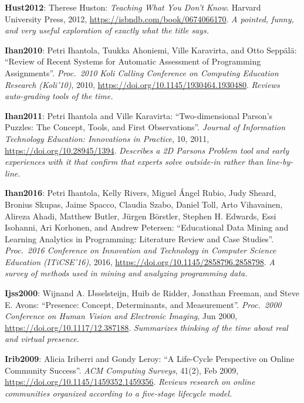 \textbf{\hypertarget{b:Hust2012}{Hust2012}\label{b:Hust2012}}: Therese Huston: \emph{Teaching What You Don't Know}. Harvard University Press, 2012, \url{https://isbndb.com/book/0674066170}. \emph{A pointed, funny, and very useful exploration of exactly what the title says.}

\textbf{\hypertarget{b:Ihan2010}{Ihan2010}\label{b:Ihan2010}}: Petri Ihantola, Tuukka Ahoniemi, Ville Karavirta, and Otto Seppälä: ``Review of Recent Systems for Automatic Assessment of Programming Assignments''. \emph{Proc.\ 2010 Koli Calling Conference on Computing Education Research (Koli'10)}, 2010, \url{https://doi.org/10.1145/1930464.1930480}. \emph{Reviews auto-grading tools of the time.}

\textbf{\hypertarget{b:Ihan2011}{Ihan2011}\label{b:Ihan2011}}: Petri Ihantola and Ville Karavirta: ``Two-dimensional Parson's Puzzles: The Concept, Tools, and First Observations''. \emph{Journal of Information Technology Education: Innovations in Practice}, 10, 2011, \url{https://doi.org/10.28945/1394}. \emph{Describes a 2D Parsons Problem tool and early experiences with it that confirm that experts solve outside-in rather than line-by-line.}

\textbf{\hypertarget{b:Ihan2016}{Ihan2016}\label{b:Ihan2016}}: Petri Ihantola, Kelly Rivers, Miguel Ángel Rubio, Judy Sheard, Bronius Skupas, Jaime Spacco, Claudia Szabo, Daniel Toll, Arto Vihavainen, Alireza Ahadi, Matthew Butler, Jürgen Börstler, Stephen H. Edwards, Essi Isohanni, Ari Korhonen, and Andrew Petersen: ``Educational Data Mining and Learning Analytics in Programming: Literature Review and Case Studies''. \emph{Proc.\ 2016 Conference on Innovation and Technology in Computer Science Education (ITiCSE'16)}, 2016, \url{https://doi.org/10.1145/2858796.2858798}. \emph{A survey of methods used in mining and analyzing programming data.}

\textbf{\hypertarget{b:Ijss2000}{Ijss2000}\label{b:Ijss2000}}: Wijnand A. IJsselsteijn, Huib de Ridder, Jonathan Freeman, and Steve E. Avons: ``Presence: Concept, Determinants, and Measurement''. \emph{Proc.\ 2000 Conference on Human Vision and Electronic Imaging}, Jun 2000, \url{https://doi.org/10.1117/12.387188}. \emph{Summarizes thinking of the time about real and virtual presence.}

\textbf{\hypertarget{b:Irib2009}{Irib2009}\label{b:Irib2009}}: Alicia Iriberri and Gondy Leroy: ``A Life-Cycle Perspective on Online Community Success''. \emph{ACM Computing Surveys}, 41(2), Feb 2009, \url{https://doi.org/10.1145/1459352.1459356}. \emph{Reviews research on online communities organized according to a five-stage lifecycle model.}

